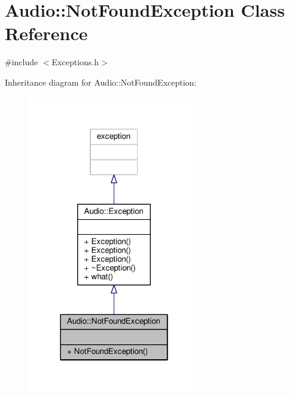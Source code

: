 \hypertarget{classAudio_1_1NotFoundException}{}\section{Audio\+:\+:Not\+Found\+Exception Class Reference}
\label{classAudio_1_1NotFoundException}


{\ttfamily \#include $<$Exceptions.\+h$>$}



Inheritance diagram for Audio\+:\+:Not\+Found\+Exception\+:
\nopagebreak
\begin{figure}[H]
\begin{center}
\leavevmode
\includegraphics[width=214pt]{dd/ddb/classAudio_1_1NotFoundException__inherit__graph}
\end{center}
\end{figure}


